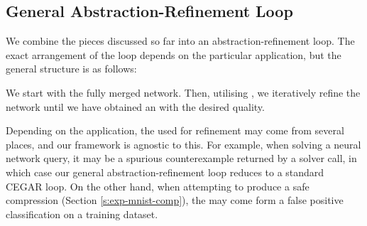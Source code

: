 \subsection{General Abstraction-Refinement Loop}
\label{s:abs-ref-fw}

We combine the pieces discussed so far into an abstraction-refinement loop. The
exact arrangement of the loop depends on the particular application, but the
general structure is as follows:

We start with the fully merged network. Then, utilising \gencex, we iteratively
refine the network until we have obtained an \abs with the desired quality.

Depending on the application, the \gencex used for refinement may come from
several places, and our framework is agnostic to this. For example, when solving
a neural network query, it may be a spurious counterexample returned by a solver
call, in which case our general abstraction-refinement loop reduces to a
standard CEGAR loop. On the other hand, when attempting to produce a safe
compression (Section \ref{s:exp-mnist-comp}), the \gencex may come form a false
positive classification on a training dataset.

